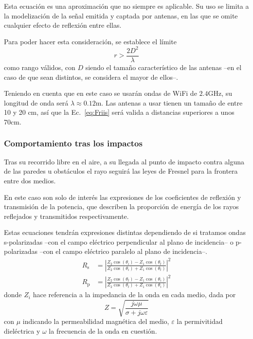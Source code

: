 Esta ecuación es una aproximación que no siempre es aplicable.
Su uso se limita a la modelización de la señal emitida y captada por antenas, en las que se omite cualquier efecto de reflexión entre ellas.

Para poder hacer esta consideración, se establece el límite
\begin{equation}
    r > \frac{2D^2}{\lambda}
\end{equation}
como rango válidos, con $D$ siendo el tamaño característico de las antenas --en el caso de que sean distintos, se considera el mayor de ellos--.

Teniendo en cuenta que en este caso se usarán ondas de WiFi de $2.4\si{\giga\hertz}$, su longitud de onda será $\lambda\approx 0.12\si{\meter}$.
Las antenas a usar tienen un tamaño de entre 10 y 20 cm, así que la Ec.~\eqref{eq:Friis} será valida a distancias superiores a unos 70cm.


\subsubsection*{Comportamiento tras los impactos}

Tras su recorrido libre en el aire, a su llegada al punto de impacto contra alguna de las paredes u obstáculos el rayo seguirá las leyes de Fresnel para la frontera entre dos medios.

En este caso son solo de interés las expresiones de los coeficientes de reflexión y transmisión de la potencia, que describen la proporción de energía de los rayos reflejados y transmitidos respectivamente.

Estas ecuaciones tendrán expresiones distintas dependiendo de si tratamos ondas s-polarizadas --con el campo eléctrico perpendicular al plano de incidencia-- o p-polarizadas --con el campo eléctrico paralelo al plano de incidencia--.
\begin{equation}
    \label{eq:coeff_reflx_1}
    \begin{aligned}
        R_\mathrm{s} &= \left|\frac{Z_2 \cos(\theta_i) - Z_1 \cos(\theta_t)}{Z_2 \cos(\theta_i) + Z_1 \cos(\theta_t)}\right|^2\\
        R_\mathrm{p} &= \left|\frac{Z_2 \cos(\theta_t) - Z_1 \cos(\theta_i)}{Z_2 \cos(\theta_t) + Z_1 \cos(\theta_i)}\right|^2
    \end{aligned}
\end{equation}
donde $Z_i$ hace referencia a la impedancia de la onda en cada medio, dada por
\begin{equation}
    Z = \sqrt{\frac{j\omega\mu}{\sigma + j\omega\varepsilon}}
\end{equation}
con $\mu$ indicando la permeabilidad magnética del medio, $\varepsilon$ la permivitidad dieléctrica y $\omega$ la frecuencia de la onda en cuestión.


